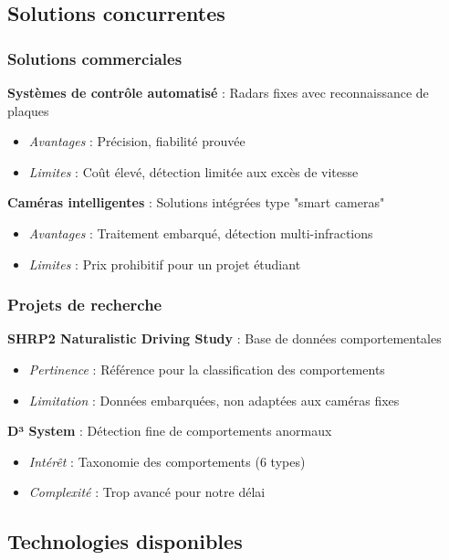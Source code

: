 \documentclass[12pt,a4paper]{article}
\begin{document}
\subsection{Solutions concurrentes}

\subsubsection{Solutions commerciales}

\textbf{Systèmes de contrôle automatisé} : Radars fixes avec reconnaissance de plaques
\begin{itemize}
    \item \textit{Avantages} : Précision, fiabilité prouvée
    \item \textit{Limites} : Coût élevé, détection limitée aux excès de vitesse
\end{itemize}

\textbf{Caméras intelligentes} : Solutions intégrées type "smart cameras"
\begin{itemize}
    \item \textit{Avantages} : Traitement embarqué, détection multi-infractions
    \item \textit{Limites} : Prix prohibitif pour un projet étudiant
\end{itemize}

\subsubsection{Projets de recherche}

\textbf{SHRP2 Naturalistic Driving Study} : Base de données comportementales
\begin{itemize}
    \item \textit{Pertinence} : Référence pour la classification des comportements
    \item \textit{Limitation} : Données embarquées, non adaptées aux caméras fixes
\end{itemize}

\textbf{D³ System} : Détection fine de comportements anormaux
\begin{itemize}
    \item \textit{Intérêt} : Taxonomie des comportements (6 types)
    \item \textit{Complexité} : Trop avancé pour notre délai
\end{itemize}

\subsection{Technologies disponibles}
\end{document}
